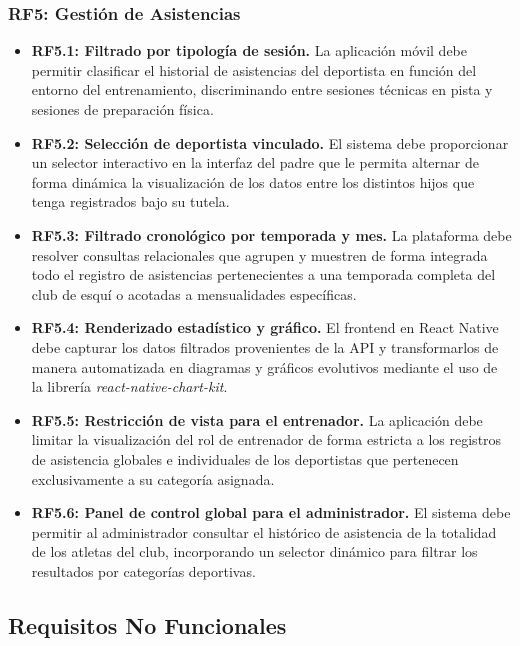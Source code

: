         \subsubsection*{RF5: Gestión de Asistencias}
        \begin{itemize}
            \item \textbf{RF5.1: Filtrado por tipología de sesión.} La aplicación móvil debe permitir clasificar el historial de asistencias del deportista en función del entorno del entrenamiento, discriminando entre sesiones técnicas en pista y sesiones de preparación física.
            \item \textbf{RF5.2: Selección de deportista vinculado.} El sistema debe proporcionar un selector interactivo en la interfaz del padre que le permita alternar de forma dinámica la visualización de los datos entre los distintos hijos que tenga registrados bajo su tutela.
            \item \textbf{RF5.3: Filtrado cronológico por temporada y mes.} La plataforma debe resolver consultas relacionales que agrupen y muestren de forma integrada todo el registro de asistencias pertenecientes a una temporada completa del club de esquí o acotadas a mensualidades específicas.
            \item \textbf{RF5.4: Renderizado estadístico y gráfico.} El frontend en React Native debe capturar los datos filtrados provenientes de la API y transformarlos de manera automatizada en diagramas y gráficos evolutivos mediante el uso de la librería \textit{react-native-chart-kit}.
            \item \textbf{RF5.5: Restricción de vista para el entrenador.} La aplicación debe limitar la visualización del rol de entrenador de forma estricta a los registros de asistencia globales e individuales de los deportistas que pertenecen exclusivamente a su categoría asignada.
            \item \textbf{RF5.6: Panel de control global para el administrador.} El sistema debe permitir al administrador consultar el histórico de asistencia de la totalidad de los atletas del club, incorporando un selector dinámico para filtrar los resultados por categorías deportivas.
        \end{itemize}  

        \subsection{Requisitos No Funcionales}

